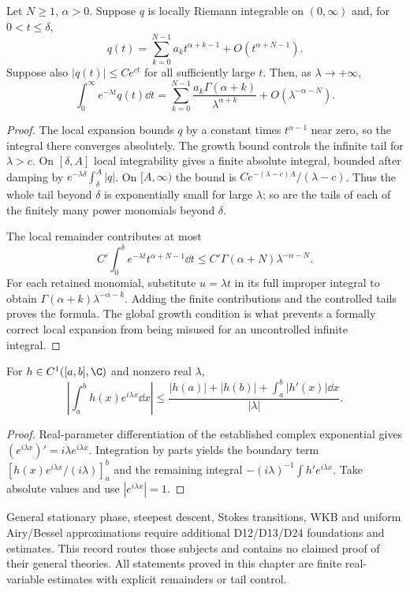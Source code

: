 \begin{theorem}
Let $N\geq1$, $\alpha>0$. Suppose $q$ is locally Riemann integrable on
$(0,\infty)$ and, for $0<t\leq\delta$,
\[
 q(t)=\sum_{k=0}^{N-1}a_kt^{\alpha+k-1}
             +O(t^{\alpha+N-1}).
\]
Suppose also $|q(t)|\leq C e^{ct}$ for all sufficiently large $t$.
Then, as $\lambda\to+\infty$,
\[
 \int_0^\infty e^{-\lambda t}q(t)\dd t
 =\sum_{k=0}^{N-1}\frac{a_k\Gamma(\alpha+k)}{\lambda^{\alpha+k}}
       +O(\lambda^{-\alpha-N}).
\]
\end{theorem}
\begin{proof}
The local expansion bounds $q$ by a constant times $t^{\alpha-1}$ near zero,
so the integral there converges absolutely. The growth bound controls the
infinite tail for $\lambda>c$. On $[\delta,A]$ local integrability gives a
finite absolute integral, bounded after damping by
$e^{-\lambda\delta}\int_\delta^A|q|$. On $[A,\infty)$ the bound is
$Ce^{-(\lambda-c)A}/(\lambda-c)$. Thus the whole tail beyond $\delta$ is
exponentially small for large $\lambda$; so are the tails of each of the
finitely many power monomials beyond $\delta$.

The local remainder contributes at most
\[
 C'\int_0^\delta e^{-\lambda t}t^{\alpha+N-1}\dd t
 \leq C'\Gamma(\alpha+N)\lambda^{-\alpha-N}.
\]
For each retained monomial, substitute $u=\lambda t$ in its full improper
integral to obtain $\Gamma(\alpha+k)\lambda^{-\alpha-k}$.
Adding the finite contributions and the controlled tails proves the formula.
The global growth condition is what prevents a formally correct local
expansion from being misused for an uncontrolled infinite integral.
\end{proof}

\begin{proposition}
For $h\in C^1([a,b],\C)$ and nonzero real $\lambda$,
\[
 \left|\int_a^b h(x)e^{i\lambda x}\dd x\right|
 \leq\frac{|h(a)|+|h(b)|+\int_a^b|h'(x)|\dd x}{|\lambda|}.
\]
\end{proposition}
\begin{proof}
Real-parameter differentiation of the established complex exponential gives
$(e^{i\lambda x})'=i\lambda e^{i\lambda x}$. Integration by parts yields
the boundary term $[h(x)e^{i\lambda x}/(i\lambda)]_a^b$ and the remaining
integral $-(i\lambda)^{-1}\int h'e^{i\lambda x}$. Take absolute values and
use $|e^{i\lambda x}|=1$.
\end{proof}

\begin{remark}
General stationary phase, steepest descent, Stokes transitions, WKB and uniform
Airy/Bessel approximations require additional D12/D13/D24 foundations and
estimates. This record routes those subjects and contains no claimed proof of
their general theories. All statements proved in this chapter are finite
real-variable estimates with explicit remainders or tail control.
\end{remark}
